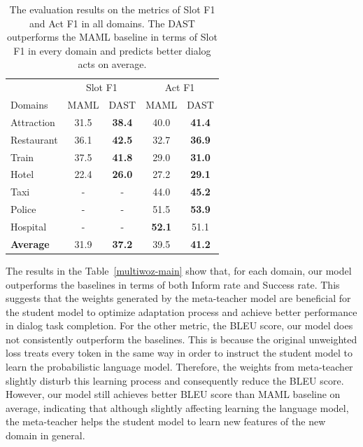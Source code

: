 \documentclass[letterpaper]{article} %
\begin{document}
\begin{table}[ht!]
\centering
\setlength{\extrarowheight}{0.06cm}
\small
\begin{tabular}[width=\columnwidth]{l|cccc}
\toprule
\hline
& \multicolumn{2}{c}{Slot F1} & \multicolumn{2}{c}{Act F1}\\
\cmidrule(lr){2-3} \cmidrule(lr){4-5}
Domains  &MAML& DAST &MAML& DAST  \\
\hline
Attraction & 31.5                 & \textbf{38.4}                 & 40.0                 & \textbf{41.4}  \\
\hline
Restaurant & 36.1                 & \textbf{42.5 }                & 32.7                 & \textbf{36.9}  \\
\hline
Train     & 37.5                 & \textbf{41.8}                 & 29.0                 & \textbf{31.0}\\
\hline
Hotel& 22.4                 & \textbf{26.0}                 & 27.2                 & \textbf{29.1} \\
\hline
Taxi & -                & -               & 44.0                 & \textbf{45.2}                  \\
\hline
Police & -                 &-                & 51.5                 & \textbf{53.9 }                 \\
\hline
Hospital&-         & -      & \textbf{52.1}   & 51.1  \\
\hline
\textbf{Average}  & 31.9    & \textbf{37.2}  & 39.5   & \textbf{41.2}\\
\hline
\bottomrule
\end{tabular}
\caption{The evaluation results on the metrics of Slot F1 and Act F1 in all domains. The DAST outperforms the MAML baseline in terms of Slot F1 in every domain and predicts better dialog acts on average. }
\label{multiwoz_slot}
\end{table}


The results in the Table~\ref{multiwoz-main} show that, for each domain, our model outperforms the baselines in terms of both Inform rate and Success rate. This suggests that the weights generated by the meta-teacher model are beneficial for the student model to optimize adaptation process and achieve better performance in dialog task completion.
For the other metric, the BLEU score, our model does not consistently outperform the baselines. This is because the original unweighted loss treats every token in the same way in order to instruct the student model to learn the probabilistic language model. Therefore, the weights from meta-teacher slightly disturb this learning process and consequently reduce the BLEU score. However, our model still achieves better BLEU score than MAML baseline on average, indicating that although slightly affecting learning the language model, the meta-teacher helps the student model to learn new features of the new domain in general.
\end{document}
